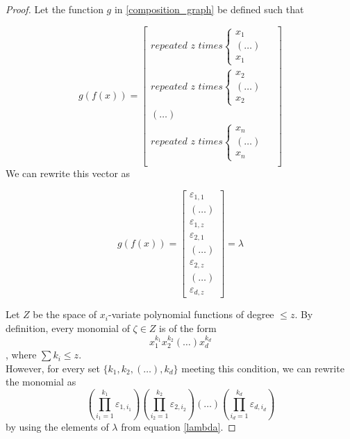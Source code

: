 \documentclass[11pt]{article}
\theoremstyle{definition}
\theoremstyle{definition}
\begin{document}
\begin{proof}
Let the function $g$ in \ref{composition_graph} be defined such that

\begin{equation}
    g(f(x))
    = 
    \begin{bmatrix}
        \textit{repeated $z$ times} 
        \begin{cases}
            x_1 &  \\
            (\dots) & \\
            x_1 & 
        \end{cases} \\
        \textit{repeated $z$ times} 

        \begin{cases}
            x_2 &  \\
            (\dots) & \\
            x_2 & 
        \end{cases} \\
        (\dots) \\
        \textit{repeated $z$ times} 
        \begin{cases}
            x_n &  \\
            (\dots) & \\
            x_n & 
        \end{cases} \\
    \end{bmatrix}
\end{equation}
We can rewrite this vector as 

\begin{equation} \label{lambda}
    g(f(x))
    = 
    \begin{bmatrix}
        \varepsilon_{1, 1} \\
        (\dots) \\
        \varepsilon_{1, z} \\
        \varepsilon_{2, 1} \\
        (\dots) \\
        \varepsilon_{2, z} \\
        (\dots) \\
        \varepsilon_{d, z} 
    \end{bmatrix}
    = \lambda
\end{equation}

Let $Z$ be the space of $x_i$-variate polynomial functions 
of degree $\leq z$. By definition, every monomial of $\zeta \in Z$ is of the form
\begin{equation}
    x_{1}^{k_1}x_{2}^{k_2}(\dots)x_{d}^{k_d}
\end{equation}
, where $\sum k_i \leq z$. \\
However, for every set $\{k_1, k_2, (\dots), k_d\}$ meeting this condition,
we can rewrite the monomial as
\begin{equation}
    \left( \prod_{i_1=1}^{k_1}\varepsilon_{1, i_1} \right)
    \left( \prod_{i_2=1}^{k_2}\varepsilon_{2, i_2} \right)
    \left( \dots \right)
    \left( \prod_{i_d=1}^{k_d}\varepsilon_{d, i_d} \right)
\end{equation}
by using the elements of $\lambda$ from equation \eqref{lambda}.


\end{proof}
\end{document}
